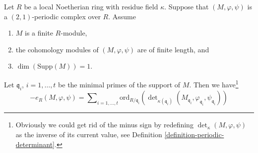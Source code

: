 %

\begin{proposition}
\label{proposition-length-determinant-periodic-complex}
Let $R$ be a local Noetherian ring with residue field $\kappa$.
Suppose that $(M, \varphi, \psi)$ is a $(2, 1)$-periodic
complex over $R$. Assume
\begin{enumerate}
\item $M$ is a finite $R$-module,
\item the cohomology modules of $(M, \varphi, \psi)$ are of finite length, and
\item $\dim(\text{Supp}(M)) = 1$.
\end{enumerate}
Let $\mathfrak q_i$, $i = 1, \ldots, t$ be the minimal
primes of the support of $M$. Then we have\footnote{
Obviously we could get rid of the minus sign by redefining
$\det_\kappa(M, \varphi, \psi)$ as the inverse of its
current value, see Definition \ref{definition-periodic-determinant}.}
$$
- e_R(M, \varphi, \psi) =
\sum\nolimits_{i = 1, \ldots, t}
\text{ord}_{R/\mathfrak q_i}\left(
\det\nolimits_{\kappa(\mathfrak q_i)}
(M_{\mathfrak q_i}, \varphi_{\mathfrak q_i}, \psi_{\mathfrak q_i})
\right)
$$
\end{proposition}

